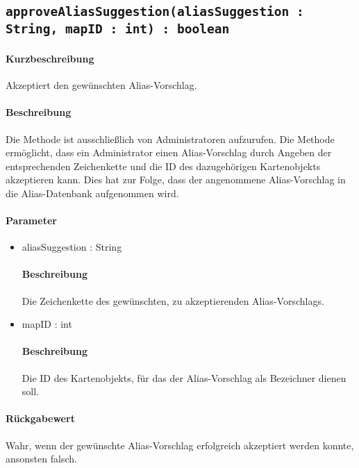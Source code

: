 \subsection{\texttt{approveAliasSuggestion(aliasSuggestion : String, mapID : int) : boolean}}%
\paragraph*{Kurzbeschreibung}
Akzeptiert den gewünschten Alias-Vorschlag.
\paragraph*{Beschreibung}
Die Methode ist ausschließlich von Administratoren aufzurufen.
Die Methode ermöglicht, dass ein Administrator einen Alias-Vorschlag durch Angeben der entsprechenden Zeichenkette und die ID des dazugehörigen Kartenobjekts akzeptieren kann.
Dies hat zur Folge, dass der angenommene Alias-Vorschlag in die Alias-Datenbank aufgenommen wird.
\paragraph*{Parameter}
\begin{itemize}
	\item aliasSuggestion : String
		\paragraph*{Beschreibung}
		Die Zeichenkette des gewünschten, zu akzeptierenden Alias-Vorschlags.
	\item mapID : int
		\paragraph*{Beschreibung}
		Die ID des Kartenobjekts, für das der Alias-Vorschlag als Bezeichner dienen soll.
\end{itemize}
\paragraph*{Rückgabewert}
Wahr, wenn der gewünschte Alias-Vorschlag erfolgreich akzeptiert werden konnte, ansonsten falsch.
